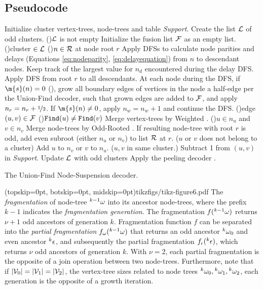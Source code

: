 \subsection{Pseudocode}\label{sec:pseudocode}
\begin{algorithm}[htb]
  \BlankLine
  \BlankLine
  Initialize cluster vertex-trees, node-trees and table \emph{Support}.\;\label{algo:B1a}
  Create the list $\mathcal{L}$ of odd clusters.\;
  \While(){$\mathcal{L}$ is not empty}{
    Initialize the fusion list $\mathcal{F}$ as an empty list.\;\label{algo:B1b}
    \For(){cluster $\in\mathcal{L}$ \label{algo:B2a}}{
      \For(){$n \in\mathcal{R}$ at node root $r$}{
        Apply DFSs to calculate node parities and delays (Equations \eqref{eq:nodeparity}, \eqref{eq:delayequation}) from $n$ to descendant nodes. Keep track of the largest value for $n_d$ encountered during the delay DFS.\;\label{algo:pdc}
      }
      Apply DFS from root $r$ to all descendants. At each node during the DFS, if $\m{s}(n)=0$ (), grow all boundary edges of vertices in the node a half-edge per the Union-Find decoder, such that grown edges are added to $\mathcal{F}$, and apply $n_r=n_r+\nicefrac{1}{2}$. If $\m{s}(n)\neq0$, apply $n_w=n_w+1$ and continue the DFS.\;\label{algo:grow}
    }
    \For(){edge $(u,v) \in \mathcal{F}$\label{algo:B3a}}{
      \eIf(){$\texttt{Find}(u)\neq\texttt{Find}(v)$}{
        Merge vertex-trees by Weighted .\;
        \eIf(){$u \in n_u$ and $v \in n_v$\label{algo:joina}}{
          Merge node-trees by Odd-Rooted . If resulting node-tree with root $r$ is odd, add even subroot (either $n_u$ or $n_v$) to list $\mathcal{R}$ at $r$.\;
        }($u$ or $v$ does not belong to a cluster){
          Add $u$ to $n_v$ or $v$ to $n_u$.\;\label{algo:joinb}
        }
      }($u,v$ in same cluster.\label{algo:dfa}){
        Subtract 1 from $(u,v)$ in \emph{Support}.\;\label{algo:dfb}
      }
    }
    Update $\mathcal{L}$ with odd clusters\; \label{algo:B3b}
  }
  Apply the peeling decoder \cite{delfosse2017linear}.\label{algo:B4a}
  \caption{The Union-Find Node-Suspension decoder.}\label{algo:ufbb}
\end{algorithm}

\Figure[hbt](topskip=0pt, botskip=0pt, midskip=0pt){tikzfigs/tikz-figure6.pdf}{
  The \emph{fragmentation} of node-tree ${}^{k-1}\omega$ into its ancestor node-trees, where the prefix $k-1$ indicates the \emph{fragmentation generation}. The fragmentation $f({}^{k-1}\omega)$ returns $\nu+1$ odd ancestors of generation $k$. Fragmentation function $f$ can be separated into the \emph{partial fragmentation} $f_\omega({}^{k-1}\omega)$ that returns an odd ancestor ${}^{k}\omega_0$ and even ancestor ${}^{k}\epsilon$, and subsequently the partial fragmentation $f_\epsilon({}^{k}\epsilon)$, which returns $\nu$ odd ancestors of generation $k$. With $\nu=2$, each partial fragmentation is the opposite of a join operation between two node-trees. Furthermore, note that if $\lvert\mathcal{V}_0\rvert = \lvert\mathcal{V}_1\rvert = \lvert\mathcal{V}_2\rvert$, the vertex-tree sizes related to node trees ${}^{k}\omega_0, {}^{k}\omega_1, {}^{k}\omega_2$, each generation is the opposite of a growth iteration. \label{fig6}}

